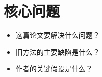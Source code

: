 \section{核心问题}

\begin{itemize}
  \item 这篇论文要解决什么问题？
  \item 旧方法的主要缺陷是什么？
  \item 作者的关键假设是什么？
\end{itemize}
